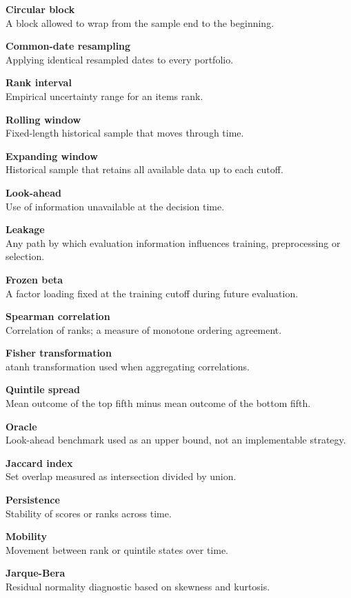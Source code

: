 \textbf{Circular block}\\
A block allowed to wrap from the sample end to the beginning.

\textbf{Common-date resampling}\\
Applying identical resampled dates to every portfolio.

\textbf{Rank interval}\\
Empirical uncertainty range for an item\textquotesingle s rank.

\textbf{Rolling window}\\
Fixed-length historical sample that moves through time.

\textbf{Expanding window}\\
Historical sample that retains all available data up to each cutoff.

\textbf{Look-ahead}\\
Use of information unavailable at the decision time.

\textbf{Leakage}\\
Any path by which evaluation information influences training,
preprocessing or selection.

\textbf{Frozen beta}\\
A factor loading fixed at the training cutoff during future evaluation.

\textbf{Spearman correlation}\\
Correlation of ranks; a measure of monotone ordering agreement.

\textbf{Fisher transformation}\\
atanh transformation used when aggregating correlations.

\textbf{Quintile spread}\\
Mean outcome of the top fifth minus mean outcome of the bottom fifth.

\textbf{Oracle}\\
Look-ahead benchmark used as an upper bound, not an implementable
strategy.

\textbf{Jaccard index}\\
Set overlap measured as intersection divided by union.

\textbf{Persistence}\\
Stability of scores or ranks across time.

\textbf{Mobility}\\
Movement between rank or quintile states over time.

\textbf{Jarque-Bera}\\
Residual normality diagnostic based on skewness and kurtosis.

